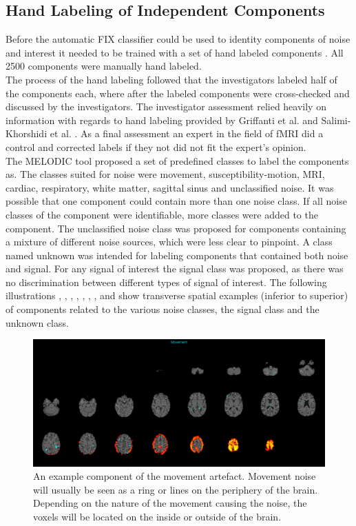 \subsection{Hand Labeling of Independent Components}
Before the automatic FIX classifier could be used to identity components of noise and interest it needed to be trained with a set of hand labeled components \cite{Salimi-Khorshidi2014}. All 2500 components were manually hand labeled. \\
The process of the hand labeling followed that the investigators labeled half of the components each, where after the labeled components were cross-checked and discussed by the investigators. The investigator assessment relied heavily on information with regards to hand labeling provided by Griffanti et al. \cite{Griffanti2017} and Salimi-Khorshidi et al. \cite{Salimi-Khorshidi2014}. As a final assessment an expert in the field of fMRI did a control and corrected labels if they not did not fit the expert's opinion. \\
The MELODIC tool proposed a set of predefined classes to label the components as. The classes suited for noise were movement, susceptibility-motion, MRI, cardiac, respiratory, white matter, sagittal sinus and unclassified noise. It was possible that one component could contain more than one noise class. If all noise classes of the component were identifiable, more classes were added to the component. The unclassified noise class was proposed for components containing a mixture of different noise sources, which were less clear to pinpoint. A class named unknown was intended for labeling components that contained both noise and signal. For any signal of interest the signal class was proposed, as there was no discrimination between different types of signal of interest. 
The following illustrations , , , , , , ,  and  show transverse spatial examples (inferior to superior) of components related to the various noise classes, the signal class and the unknown class.

\begin{figure}[H]                 
	\includegraphics[width=.85\textwidth]{figures/bMethods/Movement}  
	\caption{An example component of the movement artefact. Movement noise will usually be seen as a ring or lines on the periphery of the brain. Depending on the nature of the movement causing the noise, the voxels will be located on the inside or outside of the brain.}
	\label{fig:meth:Movement} 
\end{figure}


